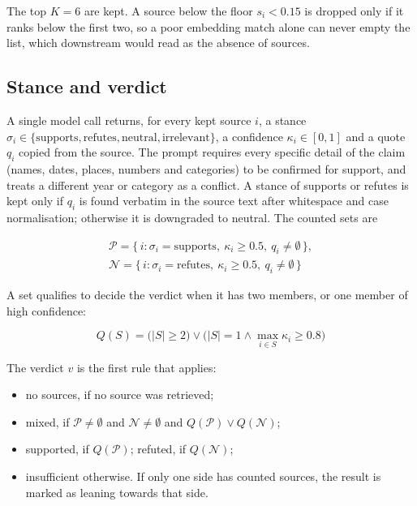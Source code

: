 \documentclass[conference]{IEEEtran}
\begin{document}
The top $K=6$ are kept. A source below the floor $s_i < 0.15$ is dropped only if it ranks below the first two, so a poor embedding match alone can never empty the list, which downstream would read as the absence of sources.

\subsection{Stance and verdict}

A single model call returns, for every kept source $i$, a stance $\sigma_i \in \{\text{supports},\text{refutes},\text{neutral},\text{irrelevant}\}$, a confidence $\kappa_i \in [0,1]$ and a quote $q_i$ copied from the source. The prompt requires every specific detail of the claim (names, dates, places, numbers and categories) to be confirmed for support, and treats a different year or category as a conflict. A stance of supports or refutes is kept only if $q_i$ is found verbatim in the source text after whitespace and case normalisation; otherwise it is downgraded to neutral. The counted sets are

\begin{equation}
\begin{aligned}
\mathcal{P} = \{\, i : \sigma_i = \text{supports},\ \kappa_i \ge 0.5,\ q_i \ne \emptyset \,\}, \\
\mathcal{N} = \{\, i : \sigma_i = \text{refutes},\ \kappa_i \ge 0.5,\ q_i \ne \emptyset \,\}
\end{aligned}
\end{equation}

A set qualifies to decide the verdict when it has two members, or one member of high confidence:

\begin{equation}
Q(S) = \bigl(|S| \ge 2\bigr) \lor \bigl(|S| = 1 \land \max_{i \in S} \kappa_i \ge 0.8\bigr)
\end{equation}

The verdict $v$ is the first rule that applies:

\begin{itemize}
\item no sources, if no source was retrieved;
\item mixed, if $\mathcal{P} \ne \emptyset$ and $\mathcal{N} \ne \emptyset$ and $Q(\mathcal{P}) \lor Q(\mathcal{N})$;
\item supported, if $Q(\mathcal{P})$; refuted, if $Q(\mathcal{N})$;
\item insufficient otherwise. If only one side has counted sources, the result is marked as leaning towards that side.
\end{itemize}
\end{document}
